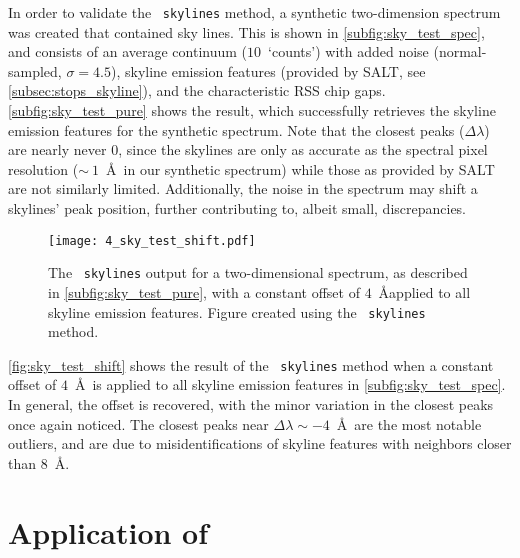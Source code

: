 In order to validate the \stops\ \texttt{skylines} method, a synthetic two-dimension spectrum was created that contained sky lines. This is shown in \autoref{subfig:sky_test_spec}, and consists of an average continuum ($10$~`counts') with added noise (normal-sampled, $\sigma = 4.5$), skyline emission features (provided by \gls{SALT}, see \autoref{subsec:stops_skyline}), and the characteristic \gls{RSS} chip gaps.
\autoref{subfig:sky_test_pure} shows the result, which successfully retrieves the skyline emission features for the synthetic spectrum.
Note that the closest peaks ($\Delta \lambda$) are nearly never $0$, since the skylines are only as accurate as the spectral pixel resolution ($\sim~1$~\AA\ in our synthetic spectrum) while those as provided by \gls{SALT} are not similarly limited.
Additionally, the noise in the spectrum may shift a skylines' peak position, further contributing to, albeit small, discrepancies.

\begin{figure}[t]
    \centering
    \texttt{[image: 4\_sky\_test\_shift.pdf]}
    \caption{The \stops\ \texttt{skylines} output for a two-dimensional spectrum, as described in \autoref{subfig:sky_test_pure}, with a constant offset of $4$~\AA applied to all skyline emission features. Figure created using the \stops\ \texttt{skylines} method.}
    \label{fig:sky_test_shift}
\end{figure}

\autoref{fig:sky_test_shift} shows the result of the \stops\ \texttt{skylines} method when a constant offset of $4$~\AA\ is applied to all skyline emission features in \autoref{subfig:sky_test_spec}.
In general, the offset is recovered, with the minor variation in the closest peaks once again noticed.
The closest peaks near $\Delta \lambda \sim -4$~\AA\ are the most notable outliers, and are due to misidentifications of skyline features with neighbors closer than $8$~\AA.

\section[Application of \textsc{stops}]{Application of \stops} \label{sec:app_stops}

